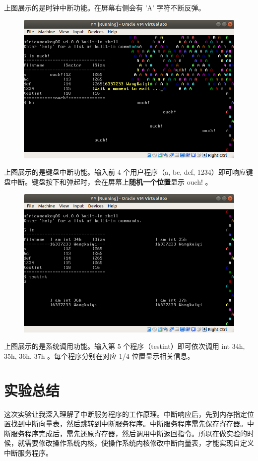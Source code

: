 \documentclass{article}
\begin{document}
上图展示的是时钟中断功能。在屏幕右侧会有 'A' 字符不断反弹。

\begin{figure}[!hbp]
	\centering
	\includegraphics[scale=0.55]{pics/2.png}
\end{figure}

上图展示的是键盘中断功能。输入前 4 个用户程序（a, bc, def, 1234）即可响应键盘中断。键盘按下和弹起时，会在屏幕上\textbf{随机一个位置}显示 ouch! 。

\newpage

\begin{figure}[!hbp]
	\centering
	\includegraphics[scale=0.55]{pics/3.png}
\end{figure}

上图展示的是系统调用功能。输入第 5 个程序（testint）即可依次调用 int 34h, 35h, 36h, 37h 。每个程序分别在对应 1/4 位置显示相关信息。

\section{实验总结}

这次实验让我深入理解了中断服务程序的工作原理。中断响应后，先到内存指定位置找到中断向量表，然后跳转到中断服务程序。中断服务程序需先保存寄存器。中断服务程序完成后，需先还原寄存器，然后调用中断返回指令。所以在做实验的时候，就需要修改操作系统内核，使操作系统内核修改中断向量表，才能实现自定义中断服务程序。
\end{document}
